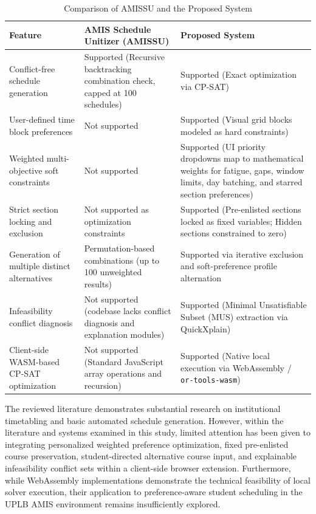 \documentclass{icsthesis}
\begin{document}
\begin{mainmatter}
		\begin{table}[htbp]
		\centering
		\caption{Comparison of AMISSU and the Proposed System}
		\label{table:amissu_vs_proposed}
		\singlespacing
		\vspace{2ex}
		\begin{tabular}{|p{1.5in}|p{2.0in}|p{2.1in}|}
		\hline
		\textbf{Feature} & \textbf{AMIS Schedule Unitizer (AMISSU)} & \textbf{Proposed System} \\
		\hline
		\hline
		Conflict-free schedule generation & Supported (Recursive backtracking combination check, capped at 100 schedules) & Supported (Exact optimization via CP-SAT) \\
		\hline
		User-defined time block preferences & Not supported & Supported (Visual grid blocks modeled as hard constraints) \\
		\hline
		Weighted multi-objective soft constraints & Not supported & Supported (UI priority dropdowns map to mathematical weights for fatigue, gaps, window limits, day batching, and starred section preferences) \\
		\hline
		Strict section locking and exclusion & Not supported as optimization constraints & Supported (Pre-enlisted sections locked as fixed variables; Hidden sections constrained to zero) \\
		\hline
		Generation of multiple distinct alternatives & Permutation-based combinations (up to 100 unweighted results) & Supported via iterative exclusion and soft-preference profile alternation \\
		\hline
		Infeasibility conflict diagnosis & Not supported (codebase lacks conflict diagnosis and explanation modules) & Supported (Minimal Unsatisfiable Subset (MUS) extraction via QuickXplain) \\
		\hline
		Client-side WASM-based CP-SAT optimization & Not supported (Standard JavaScript array operations and recursion) & Supported (Native local execution via WebAssembly / \texttt{or-tools-wasm}) \\
		\hline
		\end{tabular}
		\end{table}
		
		The reviewed literature demonstrates substantial research on institutional timetabling and basic automated schedule generation. However, within the literature and systems examined in this study, limited attention has been given to integrating personalized weighted preference optimization, fixed pre-enlisted course preservation, student-directed alternative course input, and explainable infeasibility conflict sets within a client-side browser extension. Furthermore, while WebAssembly implementations demonstrate the technical feasibility of local solver execution, their application to preference-aware student scheduling in the UPLB AMIS environment remains insufficiently explored.
		

\end{mainmatter}
\end{document}
